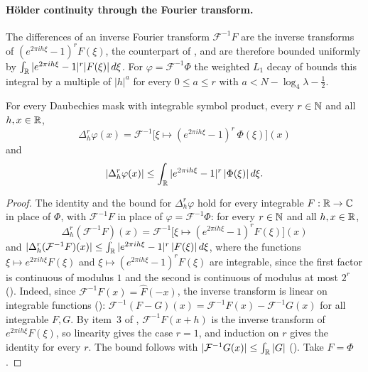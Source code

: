 \paragraph{H\"older continuity through the Fourier transform.}
The differences of an inverse Fourier transform $\mathcal F^{-1} F$ are the inverse transforms
of $(e^{2\pi i h \xi} - 1)^r F(\xi)$, the counterpart of
, and are therefore bounded uniformly by
$\int_{\mathbb{R}} |e^{2\pi i h \xi} - 1|^r |F(\xi)| \, d\xi$. For $\varphi = \mathcal F^{-1} \Phi$ the
weighted $L_1$ decay of  bounds this integral by a multiple of $|h|^a$
for every $0 \leq a \leq r$ with $a < N - \log_4 \lambda - \frac12$.

\begin{lemma}
\label{lem:daub-scaling-difference-inverse}
\leanok
{}
For every Daubechies mask with integrable symbol product, every $r \in \mathbb{N}$
and all $h, x \in \mathbb{R}$,
\[
  \Delta_h^r \varphi(x)
  = \mathcal F^{-1}\bigl[\xi \mapsto (e^{2\pi i h \xi} - 1)^r \, \Phi(\xi)\bigr](x)
\]
and
\[
  |\Delta_h^r \varphi(x)| \leq \int_{\mathbb{R}} |e^{2\pi i h \xi} - 1|^r \, |\Phi(\xi)| \, d\xi .
\]
\end{lemma}

\begin{proof}
\leanok
{}
The identity and the bound for $\Delta_h^r \varphi$ hold for every integrable $F : \mathbb{R} \to \mathbb{C}$ in
place of $\Phi$, with $\mathcal F^{-1} F$ in place of $\varphi = \mathcal F^{-1} \Phi$: for every
$r \in \mathbb{N}$ and all $h, x \in \mathbb{R}$,
\[
  \Delta_h^r (\mathcal F^{-1} F)(x)
  = \mathcal F^{-1}\bigl[\xi \mapsto (e^{2\pi i h \xi} - 1)^r F(\xi)\bigr](x)
\]
and $|\Delta_h^r (\mathcal F^{-1} F)(x)| \leq \int_{\mathbb{R}} |e^{2\pi i h \xi} - 1|^r \, |F(\xi)| \, d\xi$,
where the functions $\xi \mapsto e^{2\pi i h \xi} F(\xi)$ and
$\xi \mapsto (e^{2\pi i h \xi} - 1)^r F(\xi)$ are integrable, since the first factor is continuous
of modulus $1$ and the second is continuous of modulus at most $2^r$
(). Indeed, since $\mathcal F^{-1} F(x) = \widehat F(-x)$,
the inverse transform is linear on integrable functions ():
$\mathcal F^{-1}(F - G)(x) = \mathcal F^{-1} F(x) - \mathcal F^{-1} G(x)$ for all integrable
$F, G$. By item~3 of , $\mathcal F^{-1} F(x + h)$ is the inverse
transform of $e^{2\pi i h \xi} F(\xi)$, so linearity gives the case $r = 1$, and induction on $r$
gives the identity for every $r$. The bound follows with $|\mathcal F^{-1} G(x)| \leq \int_{\mathbb{R}} |G|$
(). Take $F = \Phi$.
\end{proof}

